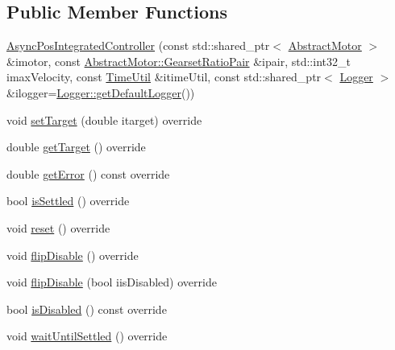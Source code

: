 \subsection*{Public Member Functions}
\begin{DoxyCompactItemize}
\item 
\mbox{\hyperlink{classokapi_1_1AsyncPosIntegratedController_a6017c7eeed0e2054ff325582c404de60}{Async\+Pos\+Integrated\+Controller}} (const std\+::shared\+\_\+ptr$<$ \mbox{\hyperlink{classokapi_1_1AbstractMotor}{Abstract\+Motor}} $>$ \&imotor, const \mbox{\hyperlink{structokapi_1_1AbstractMotor_1_1GearsetRatioPair}{Abstract\+Motor\+::\+Gearset\+Ratio\+Pair}} \&ipair, std\+::int32\+\_\+t imax\+Velocity, const \mbox{\hyperlink{classokapi_1_1TimeUtil}{Time\+Util}} \&itime\+Util, const std\+::shared\+\_\+ptr$<$ \mbox{\hyperlink{classokapi_1_1Logger}{Logger}} $>$ \&ilogger=\mbox{\hyperlink{classokapi_1_1Logger_a5053cf778b4b55acba788a3797dc96d2}{Logger\+::get\+Default\+Logger}}())
\item 
void \mbox{\hyperlink{classokapi_1_1AsyncPosIntegratedController_ae5cb385dc40c2c183266a3fa4aed7cac}{set\+Target}} (double itarget) override
\item 
double \mbox{\hyperlink{classokapi_1_1AsyncPosIntegratedController_a8d09fefb4a02fcb9d0352b4aa68821e3}{get\+Target}} () override
\item 
double \mbox{\hyperlink{classokapi_1_1AsyncPosIntegratedController_a82aeb0cb2d1aab524b9a79a249260e11}{get\+Error}} () const override
\item 
bool \mbox{\hyperlink{classokapi_1_1AsyncPosIntegratedController_a21b7ee29d335ee33aed1c41969a27f62}{is\+Settled}} () override
\item 
void \mbox{\hyperlink{classokapi_1_1AsyncPosIntegratedController_a5858445747fe5a03f17f6fd83ee9aaaa}{reset}} () override
\item 
void \mbox{\hyperlink{classokapi_1_1AsyncPosIntegratedController_a95c0b1350a2287e72d6517acdb8082b1}{flip\+Disable}} () override
\item 
void \mbox{\hyperlink{classokapi_1_1AsyncPosIntegratedController_a6476dde71ef77fceb1c461b4f0ebe62b}{flip\+Disable}} (bool iis\+Disabled) override
\item 
bool \mbox{\hyperlink{classokapi_1_1AsyncPosIntegratedController_a8774fe656abb2cf72d046b40ba3572a9}{is\+Disabled}} () const override
\item 
void \mbox{\hyperlink{classokapi_1_1AsyncPosIntegratedController_a9f03807433a02bcbee583c1d85eaf55a}{wait\+Until\+Settled}} () override

\end{DoxyCompactItemize}
